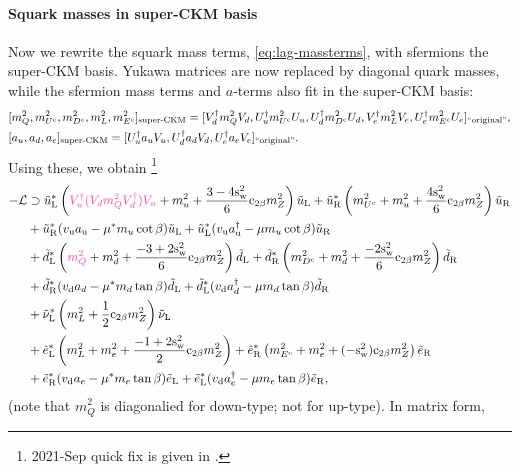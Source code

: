 \documentclass[CheatSheet]{subfiles}
\begin{document}
\paragraph{Squark masses in super-CKM basis}
Now we rewrite the squark mass terms, \cref{eq:lag-massterms}, with sfermions the super-CKM basis.
Yukawa matrices are now replaced by diagonal quark masses, while the sfermion mass terms and $a$-terms also fit in the super-CKM basis:
\begin{align}
& [m_Q^2, m_{U^{\mathrm{c}}}^2, m_{D^{\mathrm{c}}}^2,m_L^2,m_{E^{\mathrm{c}}}^2]_{\text{super-CKM}}
=
 [V_d^\dagger m_Q^2 V_d, U_u^\dagger m_{U^{\mathrm{c}}}^2 U_u, U_d^\dagger m_{D^{\mathrm{c}}}^2 U_d,
V_e^\dagger m_L^2 V_e, U_e^\dagger m_{E^{\mathrm{c}}}^2 U_e
]_{\text{``original''}},
\\
&[a_u, a_d, a_e]_{\text{super-CKM}}
=[U_u^\dagger a_u V_u, U_d^\dagger a_d V_d, U_e^\dagger a_e V_e
]_{\text{``original''}}.
\end{align}
Using these, we obtain%
\footnote{2021-Sep quick fix is given in .}
\begin{equation}
 \begin{split}
-\mathcal L&\supset
 \tuL^*\left(\PINK{V_u^\dagger(V_d m_Q^2 V_d^\dagger) V_u}
 +  m_u^2
 + \frac{3-4\sw^2}{6} \co{2\beta} m_Z^2
\right)\tuL
 +\tuR^*\left(
   m_{U^\cc}^2
 + m_u^2
 + \frac{4\sw^2}{6} \co{2\beta} m_Z^2
\right)\tuR
\\&
 + \tuR^*(\vu a_{{\mathrm u}}- \mu^{*}m_{u}\cot\beta)\tuL
 + \tuL^*(\vu a^{\dagger}_{{\mathrm u}}- \mu m_u\cot\beta)\tuR
\\&
 +\tdL^*\left(
\PINK{m_{Q}^2}
 + m_d^2
 + \frac{-3+2\sw^2}{6} \co{2\beta} m_Z^2
\right)\tdL
 +\tdR^*\left(
   m_{D^\cc}^2
 + m_d^2
 + \frac{-2\sw^2}{6} \co{2\beta} m_Z^2
\right)\tdR
\\&
 + \tdR^*(\vd a_d -\mu^{*}m_d\tan\beta)\tdL
 + \tdL^*(\vd a^{\dagger}_d-\mu m_d\tan\beta)\tdR
\\&
 +\tnuL^*\left(
 m_{L}^2
 + \frac{1}{2} \co{2\beta} m_Z^2
 \right)\tnuL
\\&
 +\teL^*\left(
 m_{L}^2
 + m_e^2
 + \frac{-1+2\sw^2}{2} \co{2\beta} m_Z^2
\right)
 +\teR^*\left(
  m_{E^\cc}^2
 + m_e^2
 + (-\sw^2)\co{2\beta} m_Z^2
 \right)\teR
\\&
 + \teR^*(\vd a_e -\mu^{*}m_e\tan\beta)\teL
 + \teL^*(\vd a^{\dagger}_e-\mu m_e\tan\beta)\teR,
 \end{split}
\end{equation}
(note that $m_Q^2$ is diagonalied for down-type; not for up-type). In matrix form,
\end{document}
